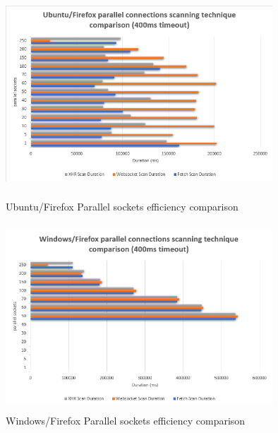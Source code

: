 \begin{figure}[ht]
\begin{adjustwidth}{-3cm}{-1cm}
\centering
\begin{minipage}{.45\textwidth}
  \centering
\includegraphics[width=10cm, height=7cm, keepaspectratio]{port_scanning_techniques/img/ubuntu_firefox_scan_technique_comparison.png}
    \caption{Ubuntu/Firefox Parallel sockets efficiency comparison}
    \label{fig:ubuntu_firefox_n_sockets}
\end{minipage}
\hspace{3cm} %
\begin{minipage}{.45\textwidth}
\includegraphics[width=10cm, height=7cm, keepaspectratio]{port_scanning_techniques/img/windows_firefox_scan_technique_comparison.png}
    \caption{Windows/Firefox Parallel sockets efficiency comparison}
    \label{fig:windows_firefox_n_sockets}
\end{minipage}
\end{adjustwidth}
\end{figure}